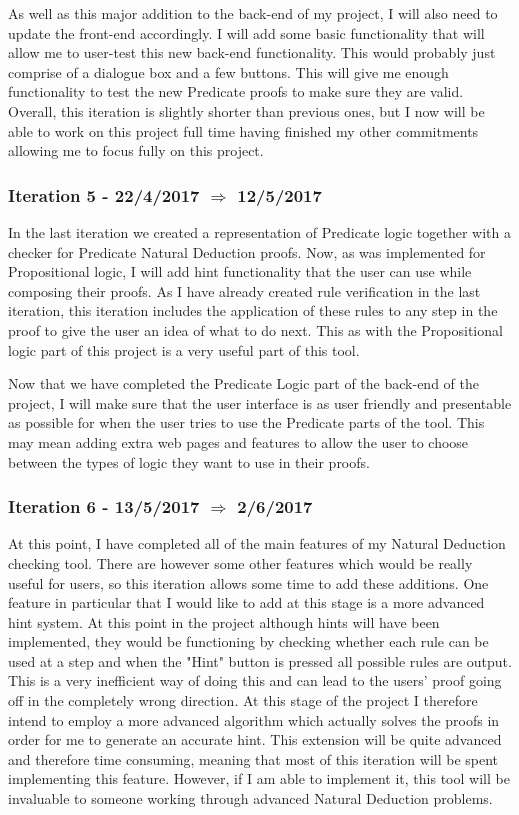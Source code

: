 As well as this major addition to the back-end of my project, I will also need to update the front-end accordingly. I will add some basic functionality that will allow me to user-test this new back-end functionality. This would probably just comprise of a dialogue box and a few buttons. This will give me enough functionality to test the new Predicate proofs to make sure they are valid. Overall, this iteration is slightly shorter than previous ones, but I now will be able to work on this project full time having finished my other commitments allowing me to focus fully on this project. 

\subsubsection{Iteration 5 - 22/4/2017 $\Rightarrow$ 12/5/2017}

In the last iteration we created a representation of Predicate logic together with a checker for Predicate Natural Deduction proofs. Now, as was implemented for Propositional logic, I will add hint functionality that the user can use while composing their proofs. As I have already created rule verification in the last iteration, this iteration includes the application of these rules to any step in the proof to give the user an idea of what to do next. This as with the Propositional logic part of this project is a very useful part of this tool. 

Now that we have completed the Predicate Logic part of the back-end of the project, I will make sure that the user interface is as user friendly and presentable as possible for when the user tries to use the Predicate parts of the tool. This may mean adding extra web pages and features to allow the user to choose between the types of logic they want to use in their proofs.

\subsubsection{Iteration 6 - 13/5/2017 $\Rightarrow$ 2/6/2017}

At this point, I have completed all of the main features of my Natural Deduction checking tool. There are however some other features which would be really useful for users, so this iteration allows some time to add these additions. One feature in particular that I would like to add at this stage is a more advanced hint system. At this point in the project although hints will have been implemented, they would be functioning by checking whether each rule can be used at a step and when the "Hint" button is pressed all possible rules are output. This is a very inefficient way of doing this and can lead to the users' proof going off in the completely wrong direction. At this stage of the project I therefore intend to employ a more advanced algorithm which actually solves the proofs in order for me to generate an accurate hint. This extension will be quite advanced and therefore time consuming, meaning that most of this iteration will be spent implementing this feature. However, if I am able to implement it, this tool will be invaluable to someone working through advanced Natural Deduction problems.

